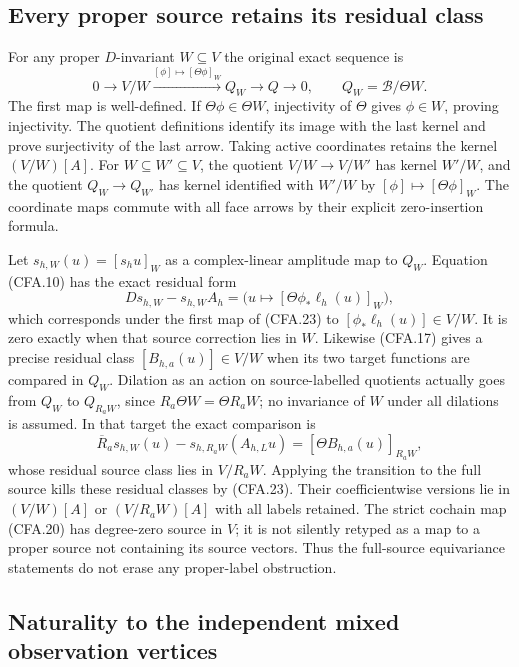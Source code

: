 \subsection{Every proper source retains its residual class}

For any proper $D$-invariant $W\subseteq V$ the original exact
sequence is
\[
 0\to V/W\xrightarrow{[\phi]\mapsto[\Theta\phi]_W}
       Q_W\longrightarrow Q\to0,\qquad Q_W=\mathscr B/\Theta W.
                                                               \tag{CFA.23}
\]
The first map is well-defined.  If $\Theta\phi\in\Theta W$,
injectivity of $\Theta$ gives $\phi\in W$, proving injectivity.
The quotient definitions identify its image with the last kernel
and prove surjectivity of the last arrow.  Taking active coordinates
retains the kernel $(V/W)[A]$.  For $W\subseteq W'\subseteq V$,
the quotient $V/W\to V/W'$ has kernel $W'/W$, and the quotient
$Q_W\to Q_{W'}$ has kernel identified with $W'/W$ by
$[\phi]\mapsto[\Theta\phi]_W$.  The coordinate maps commute with
all face arrows by their explicit zero-insertion formula.

Let $s_{h,W}(u)=[s_hu]_W$ as a complex-linear amplitude map to
$Q_W$.  Equation (CFA.10) has the exact residual form
\[
 D s_{h,W}-s_{h,W}A_h
   =\bigl(u\mapsto[\Theta\phi_*\ell_h(u)]_W\bigr),            \tag{CFA.24}
\]
which corresponds under the first map of (CFA.23) to
$[\phi_*\ell_h(u)]\in V/W$.  It is zero exactly when that
source correction lies in $W$.  Likewise (CFA.17) gives a precise
residual class $[B_{h,a}(u)]\in V/W$ when its two target functions
are compared in $Q_W$.  Dilation as an action on source-labelled
quotients actually goes from $Q_W$ to $Q_{R_aW}$, since
$R_a\Theta W=\Theta R_aW$; no invariance of $W$ under all dilations
is assumed.  In that target the exact comparison is
\[
 \overline R_a s_{h,W}(u)-s_{h,R_aW}(A_{h,L}u)
             =[\Theta B_{h,a}(u)]_{R_aW},                    \tag{CFA.25}
\]
whose residual source class lies in $V/R_aW$.
Applying the transition to the full source kills these residual
classes by (CFA.23).  Their coefficientwise versions lie in
$(V/W)[A]$ or $(V/R_aW)[A]$ with all labels retained.
The strict cochain map (CFA.20) has degree-zero source in $V$;
it is not silently retyped as a map to a proper source not containing
its source vectors.  Thus the full-source equivariance statements
do not erase any proper-label obstruction.

\subsection{Naturality to the independent mixed observation vertices}

